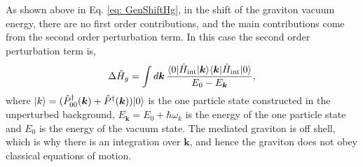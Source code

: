 \documentclass[12pt,a4paper]{report}
\theoremstyle{plain}
\theoremstyle{definition}
\theoremstyle{remark}
\newcommand{\Hint}{\hat{H}_{\text{int}}}
\DeclarePairedDelimiter\bra{\langle}{\rvert}
\DeclarePairedDelimiter\ket{\lvert}{\rangle}
\begin{document}
As shown above in Eq. \ref{eq: GenShiftHg}, in the shift of the graviton vacuum energy, there are no first order contributions, and the main contributions come from the second order perturbation term. In this case the second order perturbation term is,
\begin{equation}
    \Delta \hat{H}_{g} = \int d\bm{k}\,\frac{\bra{0}\Hint\ket{\bm{k}}\bra{\bm{k}}\Hint\ket{0}}{E_0 - E_{\bm{k}}},
    \label{eq: GenShiftHg2}
\end{equation}
where $\ket{k} = (\hat{P}_{00}^{\dagger}(\bm{k}) + \hat{P}^{\dagger}(\bm{k})) \ket{0}$ is the one particle state constructed in the unperturbed background, $E_{\bm{k}} = E_0 + \hbar\omega_k$ is the energy of the one particle state and $E_0$ is the energy of the vacuum state. The mediated graviton is off shell, which is why there is an integration over $\bm{k}$, and hence the graviton does not obey classical equations of motion.
\end{document}

